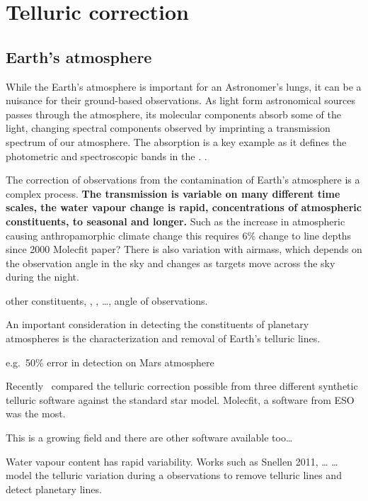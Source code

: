 

\section{Telluric correction}


\subsection{Earth's atmosphere}
While the Earth's atmosphere is important for an Astronomer's lungs, it can be a nuisance for their ground-based observations.
As light form astronomical sources passes through the atmosphere, its molecular components absorb some of the light, changing spectral components observed by imprinting a transmission spectrum of our atmosphere.
The  absorption is a key example as it defines the photometric and spectroscopic bands in the \nir{}. .

The correction of observations from the contamination of Earth's atmosphere is a complex process.\textbf{
    The transmission is variable on many different time scales, the water vapour change is rapid, concentrations of atmospheric constituents, to seasonal and longer.}
Such as the increase in atmospheric  causing anthropamorphic climate change this requires 6\% change to  line depths since 2000 Molecfit paper?
There is also variation with airmass, which depends on the observation angle in the sky and changes as targets move across the sky during the night.

other constituents, , ,  \ldots{}, angle of observations.

An important consideration in detecting the constituents of planetary atmospheres is the characterization and removal of Earth's telluric lines.

e.g.\ 50\% error in  detection on Mars atmosphere


Recently~\citet{ulmer-moll_telluric_2018} compared the telluric correction possible from three different synthetic telluric software against the standard star model.
Molecfit, a software from ESO was the most.

This is a growing field and there are other software available too\ldots{}


Water vapour content has rapid variability.
Works such as Snellen 2011, \ldots{} \ldots{} model the telluric variation during a observations to remove telluric lines and detect planetary lines.

